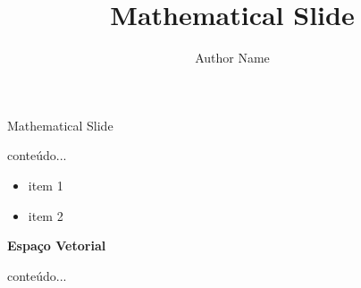 \documentclass[12pt]{beamer}
\title{Mathematical Slide}
\author{Author Name}
\institute{Science Data}
\begin{document}
	\begin{frame}[plain]
		\maketitle
	\end{frame}

	
	\begin{frame}{Mathematical Slide}

		\begin{example}		
			conteúdo...
		\end{example}
		
		
		
		\begin{itemize}
			\item item 1
			\item item 2
		\end{itemize}
		
	\end{frame}

	\begin{frame}
		\begin{definition}{\textbf{Espaço Vetorial}}

		\end{definition}
	\end{frame}

	\begin{frame}
		\begin{theorem}
			conteúdo...
		\end{theorem}
	\end{frame}
\end{document}
